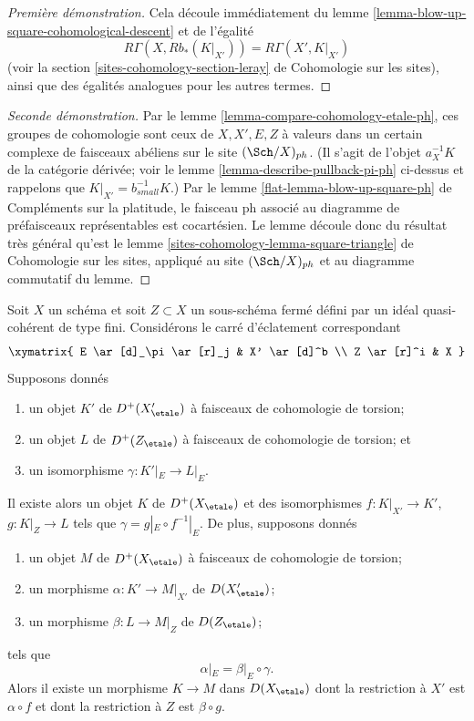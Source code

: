 \begin{proof}[Première démonstration]
Cela découle immédiatement du
lemme \ref{lemma-blow-up-square-cohomological-descent}
et de l'égalité
$$
R\Gamma(X, Rb_*(K|_{X'})) = R\Gamma(X', K|_{X'})
$$
(voir la section \ref{sites-cohomology-section-leray} de Cohomologie sur les sites),
ainsi que des égalités analogues pour les autres termes.
\end{proof}

\begin{proof}[Seconde démonstration]
Par le lemme \ref{lemma-compare-cohomology-etale-ph},
ces groupes de cohomologie sont ceux de
$X, X', E, Z$ à valeurs dans un certain complexe de faisceaux abéliens
sur le site $(\Sch/X)_{ph}$. (Il s'agit de l'objet
$a_X^{-1}K$ de la catégorie dérivée; voir le
lemme \ref{lemma-describe-pullback-pi-ph} ci-dessus
et rappelons que $K|_{X'} = b_{small}^{-1}K$.)
Par le lemme \ref{flat-lemma-blow-up-square-ph} de Compléments sur la platitude,
le faisceau ph associé au diagramme de préfaisceaux
représentables est cocartésien. Le lemme découle donc du résultat très général qu'est le
lemme \ref{sites-cohomology-lemma-square-triangle} de Cohomologie sur les sites,
appliqué au site $(\Sch/X)_{ph}$ et au diagramme commutatif
du lemme.
\end{proof}

\begin{lemma}
\label{lemma-blow-up-square-equivalence}
Soit $X$ un schéma et soit $Z \subset X$ un sous-schéma fermé
défini par un idéal quasi-cohérent de type fini. Considérons le
carré d'éclatement correspondant
$$
\xymatrix{
E \ar[d]_\pi \ar[r]_j & X' \ar[d]^b \\
Z \ar[r]^i & X
}
$$
Supposons donnés
\begin{enumerate}
\item un objet $K'$ de $D^+(X'_\etale)$ à faisceaux de cohomologie de torsion;
\item un objet $L$ de $D^+(Z_\etale)$ à faisceaux de cohomologie de torsion; et
\item un isomorphisme $\gamma : K'|_E \to L|_E$.
\end{enumerate}
Il existe alors un objet $K$ de $D^+(X_\etale)$
et des isomorphismes $f : K|_{X'} \to K'$, $g : K|_Z \to L$ tels
que $\gamma = g|_E \circ f^{-1}|_E$.
De plus, supposons donnés
\begin{enumerate}
\item un objet $M$ de $D^+(X_\etale)$ à faisceaux de cohomologie de torsion;
\item un morphisme $\alpha : K' \to M|_{X'}$ de $D(X'_\etale)$;
\item un morphisme $\beta : L \to M|_Z$ de $D(Z_\etale)$;
\end{enumerate}
tels que
$$
\alpha|_E  = \beta|_E \circ \gamma.
$$
Alors il existe un morphisme $K \to M$ dans $D(X_\etale)$
dont la restriction à $X'$ est $\alpha \circ f$
et dont la restriction à $Z$ est $\beta \circ g$.
\end{lemma}

